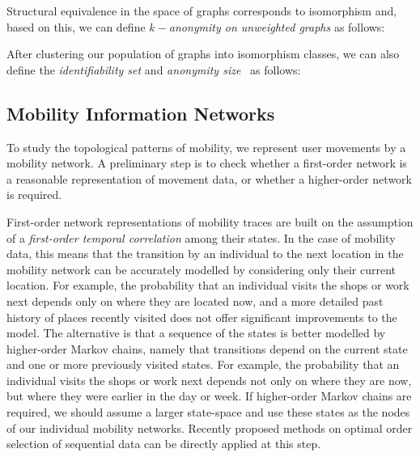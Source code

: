 Structural equivalence in the space of graphs corresponds to isomorphism and, based on this, we can define \emph{$k-$anonymity on unweighted graphs} as follows:



\vspace{.4cm}
After clustering our population of graphs into isomorphism classes, we can also define the \emph{identifiability set} and \emph{anonymity size}~\cite{anon_terminology} as follows:



\subsection{Mobility Information Networks\label{sec:mobility-networks}}

To study the topological patterns of mobility, we represent user movements by a mobility network.
A preliminary step is to check whether a first-order network is a reasonable representation of movement data, or whether a higher-order network is required.

First-order network representations of mobility traces are built on the assumption of a \emph{first-order temporal correlation} among their states.
In the case of mobility data, this means that the transition by an individual to the next location in the mobility network can be accurately modelled by considering only their current location.
For example, the probability that an individual visits the shops or work next depends only on where they are located now, and a more detailed past history of places recently visited does not offer significant improvements to the model.
The alternative is that a sequence of the states is better modelled by higher-order Markov chains, namely that transitions depend on the current state and one or more previously visited states.
For example, the probability that an individual visits the shops or work next depends not only on where they are now, but where they were earlier in the day or week.
If higher-order Markov chains are required, we should assume a larger state-space and use these states as the nodes of our individual mobility networks.
Recently proposed methods on optimal order selection of sequential data \cite{xu2016representing, scholtes2017network} can be directly applied at this step.

